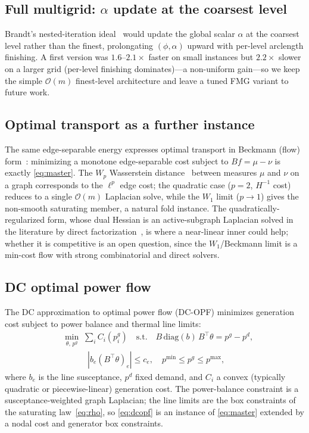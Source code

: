 \documentclass{siamart220329}
\newcommand{\Om}{\mathcal{O}(m)}
\begin{document}
\subsection{Full multigrid: $\alpha$ update at the coarsest level}\label{sec:fmg}
Brandt's nested-iteration ideal~\cite[\S5.6]{brandt-guide} would update the global scalar $\alpha$ at
the coarsest level rather than the finest, prolongating $(\phi,\alpha)$ upward with per-level
arclength finishing. A first version was $1.6$--$2.1\times$ faster on small instances but $2.2\times$
slower on a larger grid (per-level finishing dominates)---a non-uniform gain---so we keep the simple
$\Om$ finest-level architecture and leave a tuned FMG variant to future work.

\subsection{Optimal transport as a further instance}\label{sec:ot}
The same edge-separable energy expresses optimal transport in Beckmann (flow) form~\cite{beckmann}: minimizing a
monotone edge-separable cost subject to $Bf=\mu-\nu$ is exactly \eqref{eq:master}.
The $W_p$ Wasserstein distance~\cite{peyre-cuturi} between measures $\mu$ and $\nu$ on a graph
corresponds to the $\ell^p$ edge cost; the quadratic case ($p=2$, $H^{-1}$ cost) reduces to a single $\Om$ Laplacian solve, while the $W_1$ limit ($p\to1$) gives the non-smooth saturating
member, a natural fold instance. The quadratically-regularized form, whose dual Hessian is an
active-subgraph Laplacian solved in the literature by direct factorization~\cite{essid-solomon}, is
where a near-linear inner could help; whether it is competitive is an open question, since the
$W_1$/Beckmann limit is a min-cost flow with strong combinatorial and direct solvers.

\subsection{DC optimal power flow}\label{sec:dcopt}

The DC approximation to optimal power flow (DC-OPF) minimizes generation cost
subject to power balance and thermal line limits:
\begin{equation}\label{eq:dcopf}
\begin{aligned}
  &\min_{\theta,\,p^g}\;\sum_i C_i(p^g_i)
  \quad\text{s.t.}\quad
  B\,\mathrm{diag}(b)\,B^{\top}\theta = p^g - p^d,\\
  &\qquad\quad
  |b_e(B^{\top}\theta)_e|\le c_e,\quad
  p^{\min}\le p^g\le p^{\max},
\end{aligned}
\end{equation}
where $b_e$ is the line susceptance, $p^d$ fixed demand, and $C_i$ a convex
(typically quadratic or piecewise-linear) generation cost.
The power-balance constraint is a susceptance-weighted graph Laplacian; the
line limits are the box constraints of the saturating law~\eqref{eq:rho},
so \eqref{eq:dcopf} is an instance of \eqref{eq:master} extended by a nodal
cost and generator box constraints.
\end{document}
